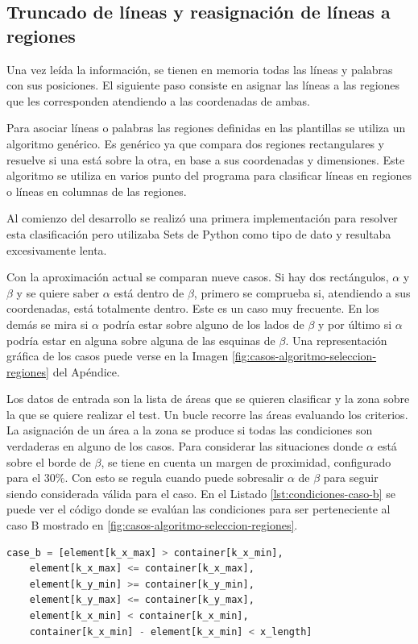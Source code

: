 \subsection{Truncado de líneas y reasignación de líneas a regiones}

Una vez leída la información, se tienen en memoria todas las líneas y palabras con sus posiciones. El siguiente paso consiste en asignar las líneas a las regiones que les corresponden atendiendo a las coordenadas de ambas.

Para asociar líneas o palabras las regiones definidas en las plantillas se utiliza un algoritmo genérico. Es genérico ya que compara dos regiones rectangulares y resuelve si una está sobre la otra, en base a sus coordenadas y dimensiones. Este algoritmo se utiliza en varios punto del programa para clasificar líneas en regiones o líneas en columnas de las regiones.

Al comienzo del desarrollo se realizó una primera implementación para resolver esta clasificación pero utilizaba Sets de Python como tipo de dato y resultaba excesivamente lenta. 

Con la aproximación actual se comparan nueve casos. Si hay dos rectángulos, $ \alpha $ y $ \beta $ y se quiere saber $ \alpha $ está dentro de $ \beta $, primero se comprueba si, atendiendo a sus coordenadas, está totalmente dentro. Este es un caso muy frecuente. En los demás se mira si $ \alpha $ podría estar sobre alguno de los lados de $ \beta $ y por último si $ \alpha $ podría estar en alguna sobre alguna de las esquinas de $ \beta $. Una representación gráfica de los casos puede verse en la Imagen \ref{fig:casos-algoritmo-seleccion-regiones} del Apéndice. 

Los datos de entrada son la lista de áreas que se quieren clasificar y la zona sobre la que se quiere realizar el test. Un bucle recorre las áreas evaluando los criterios. La asignación de un área a la zona se produce si todas las condiciones son verdaderas en alguno de los casos. Para considerar las situaciones donde $ \alpha $ está sobre el borde de $ \beta $, se tiene en cuenta un margen de proximidad, configurado para el $ 30\% $. Con esto se regula cuando puede sobresalir $ \alpha $ de $ \beta $ para seguir siendo considerada válida para el caso. En el Listado \ref{lst:condiciones-caso-b} se puede ver el código donde se evalúan las condiciones para ser perteneciente al caso B mostrado en \ref{fig:casos-algoritmo-seleccion-regiones}.

\begin{lstlisting}[language=Python,caption={Evaluación de las condiciones del Caso B.},label=lst:condiciones-caso-b]
    case_b = [element[k_x_max] > container[k_x_min],
    element[k_x_max] <= container[k_x_max],
    element[k_y_min] >= container[k_y_min],
    element[k_y_max] <= container[k_y_max],
    element[k_x_min] < container[k_x_min],
    container[k_x_min] - element[k_x_min] < x_length]
\end{lstlisting}

